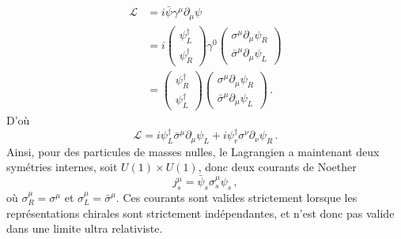 \documentclass{article}
\numberwithin{equation}{section}
\theoremstyle{solution}
\begin{document}
\begin{align*}
        \mathcal{L} &=  i\bar{\psi} \gamma^{\mu}\partial_\mu \psi \\
        &= i
        \begin{pmatrix}
                \psi_L^{\dagger} \\
                \psi_R^{\dagger}
        \end{pmatrix}
        \gamma^0
         \begin{pmatrix}
                 \sigma^{\mu} \partial_\mu \psi_R \\[1ex]
                 \bar{\sigma}^{\mu}\partial_\mu \psi_L 
         \end{pmatrix} \\
         &= 
        \begin{pmatrix}
                \psi_R^{\dagger} \\
                \psi_L^{\dagger}
        \end{pmatrix}
         \begin{pmatrix}
                 \sigma^{\mu} \partial_\mu \psi_R \\[1ex]
                 \bar{\sigma}^{\mu}\partial_\mu \psi_L 
         \end{pmatrix} \, .
\end{align*}
D'où
\begin{equation}
        \mathcal{L} = i \psi_L^{\dagger} \bar{\sigma}^{\mu} \partial_\mu \psi_L + i \psi_r^{\dagger} \sigma^{\nu}\partial_\nu \psi_R \, .
\end{equation}
Ainsi, pour des particules de masses nulles, le Lagrangien a maintenant deux symétries internes, soit $U(1)\times U(1)$, donc deux 
courants de Noether
\begin{equation}
        \boxed{j^{\mu}_s = \bar{\psi}_s \sigma^{\mu}_s \psi_s}\, ,
\end{equation} 
où $\sigma^{\mu}_R = \sigma^{\mu}$ et $\sigma^{\mu}_L = \bar{\sigma}^{\mu}$. Ces courants sont valides strictement lorsque les représentations chirales 
sont strictement indépendantes, et n'est donc pas valide dans une limite ultra relativiste. 
\end{document}
